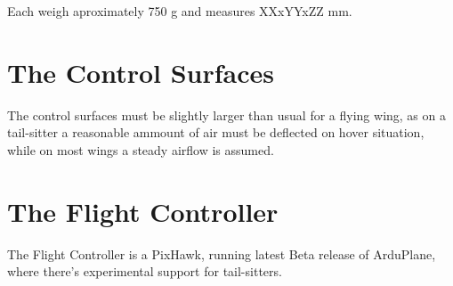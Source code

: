 Each weigh aproximately 750 g and measures XXxYYxZZ mm.

\section{The Control Surfaces}

The control surfaces must be slightly larger than usual for a flying wing, as on a tail-sitter a reasonable ammount of air must be deflected on hover situation, while on most wings a steady airflow is assumed.

\section{The Flight Controller}

The Flight Controller is a PixHawk, running latest Beta release of ArduPlane, where there's experimental support for tail-sitters.


